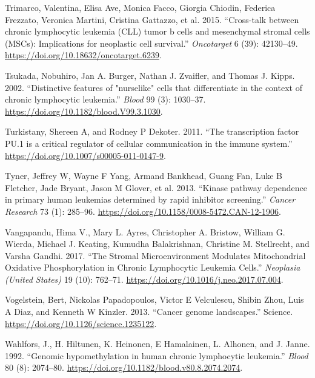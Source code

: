 \documentclass[11pt, a4paper, twosided]{book}
\newenvironment{CSLReferences}%
  {}%
  {\par}
\begin{document}
\begin{CSLReferences}{1}{0}
\leavevmode{}%
Trimarco, Valentina, Elisa Ave, Monica Facco, Giorgia Chiodin, Federica Frezzato, Veronica Martini, Cristina Gattazzo, et al. 2015. {``{Cross-talk between chronic lymphocytic leukemia (CLL) tumor b cells and mesenchymal stromal cells (MSCs): Implications for neoplastic cell survival}.''} \emph{Oncotarget} 6 (39): 42130--49. \url{https://doi.org/10.18632/oncotarget.6239}.

\leavevmode{}%
Tsukada, Nobuhiro, Jan A. Burger, Nathan J. Zvaifler, and Thomas J. Kipps. 2002. {``{Distinctive features of "nurselike" cells that differentiate in the context of chronic lymphocytic leukemia}.''} \emph{Blood} 99 (3): 1030--37. \url{https://doi.org/10.1182/blood.V99.3.1030}.

\leavevmode{}%
Turkistany, Shereen A, and Rodney P Dekoter. 2011. {``{The transcription factor PU.1 is a critical regulator of cellular communication in the immune system}.''} \url{https://doi.org/10.1007/s00005-011-0147-9}.

\leavevmode{}%
Tyner, Jeffrey W, Wayne F Yang, Armand Bankhead, Guang Fan, Luke B Fletcher, Jade Bryant, Jason M Glover, et al. 2013. {``{Kinase pathway dependence in primary human leukemias determined by rapid inhibitor screening}.''} \emph{Cancer Research} 73 (1): 285--96. \url{https://doi.org/10.1158/0008-5472.CAN-12-1906}.

\leavevmode{}%
Vangapandu, Hima V., Mary L. Ayres, Christopher A. Bristow, William G. Wierda, Michael J. Keating, Kumudha Balakrishnan, Christine M. Stellrecht, and Varsha Gandhi. 2017. {``{The Stromal Microenvironment Modulates Mitochondrial Oxidative Phosphorylation in Chronic Lymphocytic Leukemia Cells}.''} \emph{Neoplasia (United States)} 19 (10): 762--71. \url{https://doi.org/10.1016/j.neo.2017.07.004}.

\leavevmode{}%
Vogelstein, Bert, Nickolas Papadopoulos, Victor E Velculescu, Shibin Zhou, Luis A Diaz, and Kenneth W Kinzler. 2013. {``{Cancer genome landscapes}.''} Science. \url{https://doi.org/10.1126/science.1235122}.

\leavevmode{}%
Wahlfors, J., H. Hiltunen, K. Heinonen, E Hamalainen, L. Alhonen, and J. Janne. 1992. {``{Genomic hypomethylation in human chronic lymphocytic leukemia}.''} \emph{Blood} 80 (8): 2074--80. \url{https://doi.org/10.1182/blood.v80.8.2074.2074}.


\end{CSLReferences}
\end{document}
